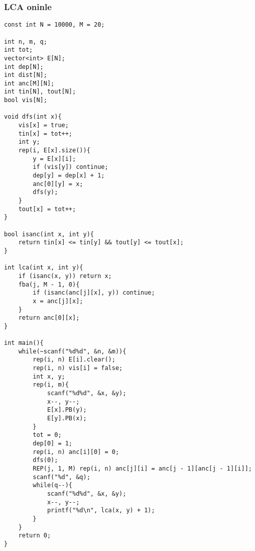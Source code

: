 \subsubsection{LCA oninle}
\begin{verbatim}
const int N = 10000, M = 20;

int n, m, q;
int tot;
vector<int> E[N];
int dep[N];
int dist[N];
int anc[M][N];
int tin[N], tout[N];
bool vis[N];

void dfs(int x){
	vis[x] = true;
	tin[x] = tot++;
	int y;
	rep(i, E[x].size()){
		y = E[x][i];
		if (vis[y]) continue;
		dep[y] = dep[x] + 1;
		anc[0][y] = x;
		dfs(y);
	}
	tout[x] = tot++;
}

bool isanc(int x, int y){
	return tin[x] <= tin[y] && tout[y] <= tout[x];
}

int lca(int x, int y){
	if (isanc(x, y)) return x;
	fba(j, M - 1, 0){
		if (isanc(anc[j][x], y)) continue;
		x = anc[j][x];
	}
	return anc[0][x];
}

int main(){
	while(~scanf("%d%d", &n, &m)){
		rep(i, n) E[i].clear();
		rep(i, n) vis[i] = false;
		int x, y;
		rep(i, m){
			scanf("%d%d", &x, &y);
			x--, y--;
			E[x].PB(y);
			E[y].PB(x);
		}
		tot = 0;
		dep[0] = 1;
		rep(i, n) anc[i][0] = 0;
		dfs(0);
		REP(j, 1, M) rep(i, n) anc[j][i] = anc[j - 1][anc[j - 1][i]];
		scanf("%d", &q);
		while(q--){
			scanf("%d%d", &x, &y);
			x--, y--;
			printf("%d\n", lca(x, y) + 1);
		}
	}
	return 0;
}
\end{verbatim}
